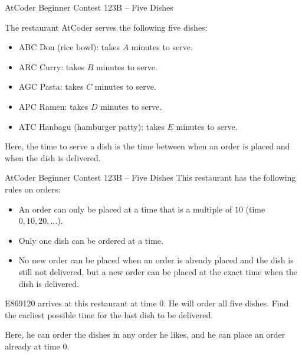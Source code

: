 \begin{frame}[fragile]{AtCoder Beginner Contest 123B -- Five Dishes}

The restaurant AtCoder serves the following five dishes:

\begin{itemize}
    \item ABC Don (rice bowl): takes $A$ minutes to serve.
    \item ARC Curry: takes $B$ minutes to serve.
    \item AGC Pasta: takes $C$ minutes to serve.
    \item APC Ramen: takes $D$ minutes to serve.
    \item ATC Hanbagu (hamburger patty): takes $E$ minutes to serve.
\end{itemize}

Here, the time to serve a dish is the time between when an order is placed and when the dish is delivered.
\end{frame}

\begin{frame}[fragile]{AtCoder Beginner Contest 123B -- Five Dishes}
This restaurant has the following rules on orders:

\begin{itemize}
    \item An order can only be placed at a time that is a multiple of $10$ (time $0, 10, 20, \ldots$).
    \item Only one dish can be ordered at a time.
    \item No new order can be placed when an order is already placed and the dish is still not delivered, but a new order can be placed at the exact time when the dish is delivered.
\end{itemize}

E869120 arrives at this restaurant at time $0$. He will order all five dishes. Find the earliest possible time for the last dish to be delivered.

Here, he can order the dishes in any order he likes, and he can place an order already at time $0$.
\end{frame}

